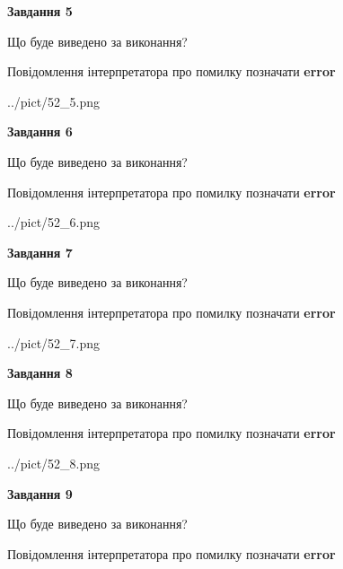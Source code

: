 \documentclass[11pt, ukrainian]{article}
\begin{document}
{\begin {large}
{\begin {center}\textbf{Завдання 5}\end {center}}\par
Що буде виведено за виконання? \par
Повідомлення інтерпретатора про помилку позначати \textbf{error}

\begin{center}
	{../pict/52_5.png}
\end{center}
\newpage

{\begin {center}\textbf{Завдання 6}\end {center}}\par
Що буде виведено за виконання? \par
Повідомлення інтерпретатора про помилку позначати \textbf{error}

\begin{center}
	{../pict/52_6.png}
\end{center}
\newpage

{\begin {center}\textbf{Завдання 7}\end {center}}\par
Що буде виведено за виконання? \par
Повідомлення інтерпретатора про помилку позначати \textbf{error}

\begin{center}
	{../pict/52_7.png}
\end{center}
\newpage

{\begin {center}\textbf{Завдання 8}\end {center}}\par
Що буде виведено за виконання? \par
Повідомлення інтерпретатора про помилку позначати \textbf{error}

\begin{center}
	{../pict/52_8.png}
\end{center}
\newpage

{\begin {center}\textbf{Завдання 9}\end {center}}\par
Що буде виведено за виконання? \par
Повідомлення інтерпретатора про помилку позначати \textbf{error}


\end{large}}
\end{document}
